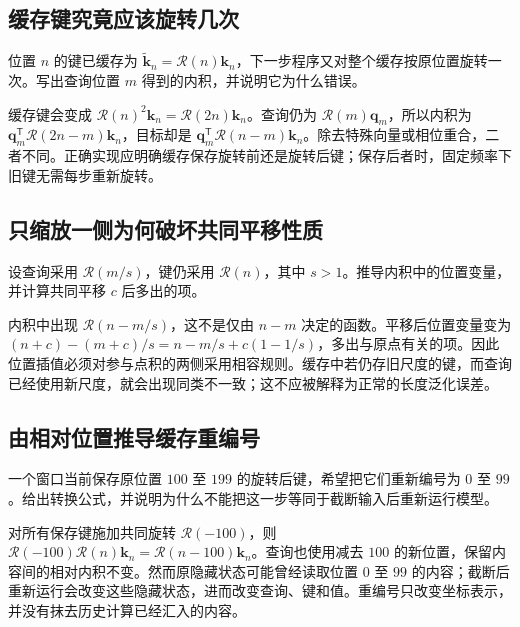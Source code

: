 \documentclass[UTF8,12pt,a4paper,fontset=fandol]{ctexart}
\begin{document}
\subsection{缓存键究竟应该旋转几次}
\begin{example}[重复旋转的相位]
位置 $n$ 的键已缓存为 $\widetilde{\mathbf k}_n=\mathcal R(n)\mathbf k_n$，下一步程序又对整个缓存按原位置旋转一次。写出查询位置 $m$ 得到的内积，并说明它为什么错误。
\end{example}
\begin{solve}
缓存键会变成 $\mathcal R(n)^2\mathbf k_n=\mathcal R(2n)\mathbf k_n$。查询仍为 $\mathcal R(m)\mathbf q_m$，所以内积为 $\mathbf q_m^{\mathsf T}\mathcal R(2n-m)\mathbf k_n$，目标却是 $\mathbf q_m^{\mathsf T}\mathcal R(n-m)\mathbf k_n$。除去特殊向量或相位重合，二者不同。正确实现应明确缓存保存旋转前还是旋转后键；保存后者时，固定频率下旧键无需每步重新旋转。
\end{solve}

\subsection{只缩放一侧为何破坏共同平移性质}
\begin{example}[查询与键使用不同位置尺度]
设查询采用 $\mathcal R(m/s)$，键仍采用 $\mathcal R(n)$，其中 $s>1$。推导内积中的位置变量，并计算共同平移 $c$ 后多出的项。
\end{example}
\begin{solve}
内积中出现 $\mathcal R(n-m/s)$，这不是仅由 $n-m$ 决定的函数。平移后位置变量变为 $(n+c)-(m+c)/s=n-m/s+c(1-1/s)$，多出与原点有关的项。因此位置插值必须对参与点积的两侧采用相容规则。缓存中若仍存旧尺度的键，而查询已经使用新尺度，就会出现同类不一致；这不应被解释为正常的长度泛化误差。
\end{solve}

\subsection{由相对位置推导缓存重编号}
\begin{example}[窗口起点移动]
一个窗口当前保存原位置 $100$ 至 $199$ 的旋转后键，希望把它们重新编号为 $0$ 至 $99$。给出转换公式，并说明为什么不能把这一步等同于截断输入后重新运行模型。
\end{example}
\begin{solve}
对所有保存键施加共同旋转 $\mathcal R(-100)$，则 $\mathcal R(-100)\mathcal R(n)\mathbf k_n=\mathcal R(n-100)\mathbf k_n$。查询也使用减去 $100$ 的新位置，保留内容间的相对内积不变。然而原隐藏状态可能曾经读取位置 $0$ 至 $99$ 的内容；截断后重新运行会改变这些隐藏状态，进而改变查询、键和值。重编号只改变坐标表示，并没有抹去历史计算已经汇入的内容。
\end{solve}
\end{document}
